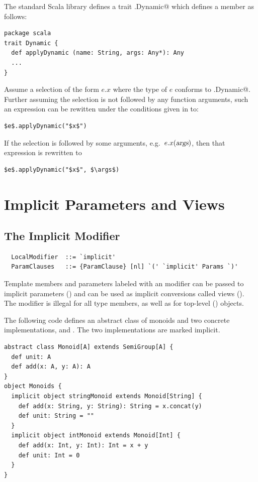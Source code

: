 The standard Scala library defines a trait \lstinline@scala.Dynamic@ which defines a member
\@invokeDynamic@ as follows:
\begin{lstlisting}
package scala
trait Dynamic {
  def applyDynamic (name: String, args: Any*): Any
  ...
}
\end{lstlisting}
Assume a selection of the form $e.x$ where the type of $e$ conforms to \lstinline@scala.Dynamic@.
Further assuming the selection is not followed by any function arguments, such an expression can be rewitten under the conditions given in  to:
\begin{lstlisting}
$e$.applyDynamic("$x$")
\end{lstlisting}
If the selection is followed by some arguments, e.g.\ $e.x(\mbox{\sl args})$, then that expression
is rewritten to
\begin{lstlisting}
$e$.applyDynamic("$x$", $\args$)
\end{lstlisting}

\chapter{Implicit Parameters and Views}\label{sec:implicits}

\section{The Implicit Modifier}\label{sec:impl-defs}

\syntax\begin{lstlisting}
  LocalModifier  ::= `implicit'
  ParamClauses   ::= {ParamClause} [nl] `(' `implicit' Params `)'
\end{lstlisting}

Template members and parameters labeled with an 
modifier can be passed to implicit parameters ()
and can be used as implicit conversions called views
(). The  modifier is illegal for all
type members, as well as for top-level ()
objects.

\example\label{ex:impl-monoid}
The following code defines an abstract class of monoids and
two concrete implementations,  and
. The two implementations are marked implicit.

\begin{lstlisting}
abstract class Monoid[A] extends SemiGroup[A] {
  def unit: A
  def add(x: A, y: A): A
}
object Monoids {
  implicit object stringMonoid extends Monoid[String] {
    def add(x: String, y: String): String = x.concat(y)
    def unit: String = ""
  }
  implicit object intMonoid extends Monoid[Int] {
    def add(x: Int, y: Int): Int = x + y
    def unit: Int = 0
  }
}
\end{lstlisting}

